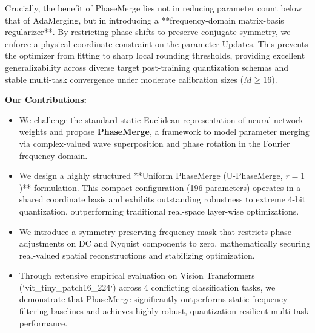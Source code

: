 Crucially, the benefit of PhaseMerge lies not in reducing parameter count below that of AdaMerging, but in introducing a **frequency-domain matrix-basis regularizer**. By restricting phase-shifts to preserve conjugate symmetry, we enforce a physical coordinate constraint on the parameter Updates. This prevents the optimizer from fitting to sharp local rounding thresholds, providing excellent generalizability across diverse target post-training quantization schemas and stable multi-task convergence under moderate calibration sizes ($M \ge 16$).

\textbf{Our Contributions:}
\begin{itemize}
    \item We challenge the standard static Euclidean representation of neural network weights and propose \textbf{PhaseMerge}, a framework to model parameter merging via complex-valued wave superposition and phase rotation in the Fourier frequency domain.
    \item We design a highly structured **Uniform PhaseMerge (U-PhaseMerge, $r=1$)** formulation. This compact configuration (196 parameters) operates in a shared coordinate basis and exhibits outstanding robustness to extreme 4-bit quantization, outperforming traditional real-space layer-wise optimizations.
    \item We introduce a symmetry-preserving frequency mask that restricts phase adjustments on DC and Nyquist components to zero, mathematically securing real-valued spatial reconstructions and stabilizing optimization.
    \item Through extensive empirical evaluation on Vision Transformers (`vit\_tiny\_patch16\_224`) across 4 conflicting classification tasks, we demonstrate that PhaseMerge significantly outperforms static frequency-filtering baselines and achieves highly robust, quantization-resilient multi-task performance.
\end{itemize}